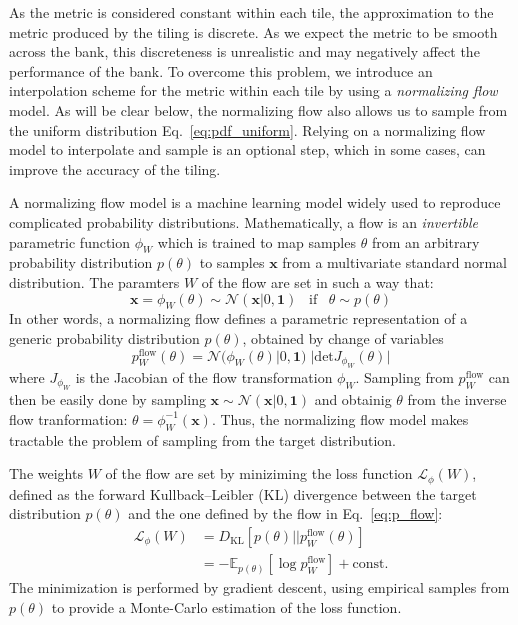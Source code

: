 \documentclass[twocolumn,showpacs,preprintnumbers,nofootinbib,prd,
superscriptaddress,10pt]{revtex4-2}
\begin{document}
As the metric is considered constant within each tile, the approximation to the metric produced by the tiling is discrete. As we expect the metric 
 to be smooth across the bank, this discreteness is unrealistic and may negatively affect the performance of the bank. To overcome this problem, we introduce an interpolation scheme for the metric within each tile by using a {\it normalizing flow} model. As will be clear below, the normalizing flow also allows us to sample from the uniform distribution Eq.~\eqref{eq:pdf_uniform}.
Relying on a normalizing flow model to interpolate and sample is an optional step, which in some cases, can improve the accuracy of the tiling. 

A normalizing flow model \cite{norm_flow, nflows_paper, Kobyzev_2021, Papamakarios_thesis} is a machine learning model widely used to reproduce complicated probability distributions.
Mathematically, a flow is an {\it invertible} parametric function $\phi_W$ which is trained to map samples $\theta$ from an arbitrary probability distribution $p(\theta)$ to samples $\mathbf{x}$ from a multivariate standard normal distribution.
The paramters $W$ of the flow are set in such a way that:
\begin{equation}
	\mathbf{x} = \phi_W(\theta) \sim \mathcal{N}(\mathbf{x}|0,\mathbf{1}) \;\;\; \text{if} \;\;\;  \theta \sim p(\theta)
\end{equation}
%
In other words, a normalizing flow defines a parametric representation of a generic probability distribution $p(\theta)$, obtained by change of variables
\begin{equation}\label{eq:p_flow}
	p^\text{flow}_W(\theta) = \mathcal{N}(\phi_W(\theta)|0,\mathbf{1}) \; |\text{det} J_{\phi_W}(\theta)|
\end{equation}
where $J_{\phi_W}$ is the Jacobian of the flow transformation $\phi_W$.
Sampling from $p^\text{flow}_W$ can then be easily done by sampling $\mathbf{x} \sim \mathcal{N}(\mathbf{x}|0,\mathbf{1})$ and obtainig $\theta$ from the inverse flow tranformation: $\theta = \phi_W^{-1}(\mathbf{x})$.
Thus, the normalizing flow model makes tractable the problem of sampling from the target distribution.

The weights $W$ of the flow are set by miniziming the loss function $\mathcal{L}_\phi(W)$, defined as the forward Kullback–Leibler (KL) divergence between the target distribution $p(\theta)$ and the one defined by the flow in Eq.~\eqref{eq:p_flow}:
\begin{align}
	\mathcal{L}_\phi(W) 	&= D_{\text{KL}}[p(\theta) || p^\text{flow}_W(\theta)] \nonumber \\
					&= - \mathbb{E}_{p(\theta)} [\log p^\text{flow}_W] + \text{const.}
\end{align}
The minimization is performed by gradient descent, using empirical samples from $p(\theta)$ to provide a Monte-Carlo estimation of the loss function.
\end{document}
